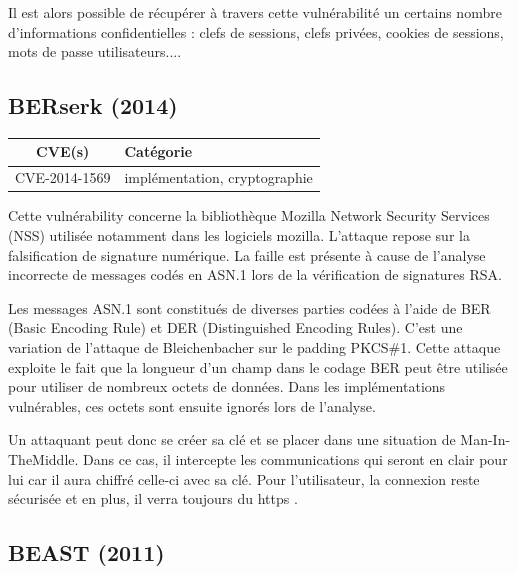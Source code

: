 Il est alors possible de récupérer à travers cette vulnérabilité un certains nombre d'informations confidentielles : clefs de sessions, clefs privées, cookies de sessions, mots de passe utilisateurs...\cite{heartbleed}.




\subsection{BERserk (2014)}

\begin{tabularx}{0.96\textwidth}{|c|X|}
  \hline
  \textbf{CVE(s)} & \textbf{Catégorie} \\
  \hline
  CVE-2014-1569 & implémentation, cryptographie \\
  \hline
\end{tabularx}

\vspace{1em}

Cette vulnérability concerne la bibliothèque Mozilla Network Security Services (NSS) utilisée notamment dans les logiciels mozilla. L'attaque repose sur la falsification de signature numérique. La faille est présente à cause de l'analyse incorrecte de messages codés en ASN.1 lors de la vérification de signatures RSA.

Les messages ASN.1 sont constitués de diverses parties codées à l'aide de BER (Basic Encoding Rule) et DER (Distinguished Encoding Rules). C'est une variation de l'attaque de Bleichenbacher sur le padding PKCS\#1. Cette attaque exploite le fait que la longueur d'un champ dans le codage BER peut être utilisée pour utiliser de nombreux octets de données. Dans les implémentations vulnérables, ces octets sont ensuite ignorés lors de l'analyse.

Un attaquant peut donc se créer sa clé et se placer dans une situation de Man-In-TheMiddle. Dans ce cas, il intercepte les communications qui seront en clair pour lui car il aura chiffré celle-ci avec sa clé. Pour l'utilisateur, la connexion reste sécurisée et en plus, il verra toujours du https \cite{berserk}.




\subsection{BEAST (2011)}

